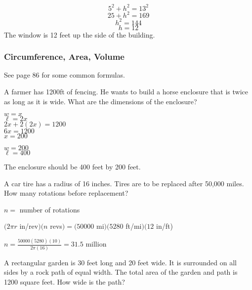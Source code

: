 \documentclass[letterpaper,12pt,fleqn]{article}
\begin{document}
\[5^2+h^2=13^2\]
\[25+h^2=169\]
\[h^2=144\]
\[h=12\]
The window is 12 feet up the side of the building.

\subsubsection*{Circumference, Area, Volume}

See page 86 for some common formulas.

A farmer has 1200ft of fencing. He wants to build a horse enclosure that is
twice as long as it is wide. What are the dimensions of the enclosure?

\bigskip


$w=x$ \\
$\ell=2x$ \\
$2x+2(2x)=1200$ \\
$6x=1200$ \\
$x=200$

$w=200$ \\
$\ell=400$

The enclosure should be 400 feet by 200 feet.

\bigskip

A car tire has a radius of 16 inches. Tires are to be replaced after 50,000
miles. How many rotations before replacement?

\bigskip


$n =$ number of rotations

$(2\pi r$ in/rev$)(n$ revs$)=(50000$ mi$)(5280$ ft/mi$)(12$ in/ft)

$n=\frac{50000(5280)(10)}{2\pi(16)}=31.5$ million

\bigskip

A rectangular garden is 30 feet long and 20 feet wide. It is surrounded on all
sides by a rock path of equal width. The total area of the garden and path is
1200 square feet. How wide is the path?

\bigskip
\end{document}
